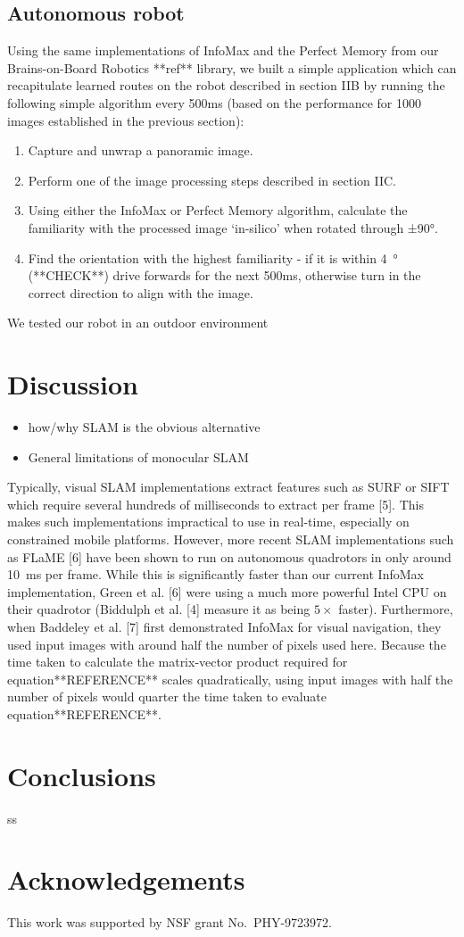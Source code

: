 \documentclass[letterpaper]{article}
\begin{document}
\subsection{Autonomous robot}
Using the same implementations of InfoMax and the Perfect Memory from our Brains-on-Board Robotics **ref** library, we built a simple application which can recapitulate learned routes on the robot described in section IIB by running the following simple algorithm every 500ms (based on the performance for 1000 images established in the previous section):
\begin{enumerate}
    \item Capture and unwrap a panoramic image.
    \item Perform one of the image processing steps described in section IIC.
    \item Using either the InfoMax or Perfect Memory algorithm, calculate the familiarity with the processed image ‘in-silico’ when rotated through ±90°.
    \item Find the orientation with the highest familiarity - if it is within \SI{4}{\degree} (**CHECK**) drive forwards for the next 500ms, otherwise turn in the correct direction to align with the image.
\end{enumerate}
We tested our robot in an outdoor environment 

\section{Discussion}
\begin{itemize}
    \item how/why SLAM is the obvious alternative
    \item General limitations of monocular SLAM
\end{itemize}
Typically, visual SLAM implementations extract features such as SURF or SIFT which require several hundreds of milliseconds to extract per frame [5]. 
This makes such implementations impractical to use in real-time, especially on constrained mobile platforms. 
However, more recent SLAM implementations such as FLaME [6] have been shown to run on autonomous quadrotors in only around \SI{10}{\milli\second} per frame. 
While this is significantly faster than our current InfoMax implementation, Green et al. [6] were using a much more powerful Intel CPU on their quadrotor (Biddulph et al. [4] measure it as being $5\times$ faster). 
Furthermore, when Baddeley et al. [7] first demonstrated InfoMax for visual navigation, they used input images with around half the number of pixels used here. 
Because the time taken to calculate the matrix-vector product required for equation**REFERENCE** scales quadratically, using input images with half the number of pixels would quarter the time taken to evaluate equation**REFERENCE**.

\section{Conclusions}
ss
\section{Acknowledgements}

This work was supported by NSF grant No.\ PHY-9723972.

\footnotesize

\end{document}
